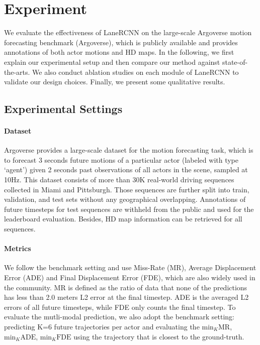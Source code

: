 \section{Experiment}

We evaluate the effectiveness of LaneRCNN on the large-scale Argoverse motion
forecasting benchmark (Argoverse), which is publicly available and provides annotations
of both actor motions and HD maps. In the following, we first
explain our experimental setup and then compare our method against
state-of-the-arts. We also conduct ablation studies on each
module of LaneRCNN to validate our design choices. Finally, we present some
qualitative results.

\subsection{Experimental Settings}
\paragraph{Dataset}
Argoverse provides a large-scale dataset \cite{argoverse} for the
motion forecasting task, which is to
forecast 3 seconds future motions of a particular actor (labeled with type
`agent') given 2 seconds past observations of all
actors in the scene, sampled at 10Hz. 
This dataset consists of more than 30K real-world driving sequences collected in Miami and Pittsburgh.
Those sequences are further split into train, validation, and test sets without
any geographical overlapping. 
Annotations of future timesteps for test sequences are withheld from the public and used for
the leaderboard evaluation. Besides, HD map information can be retrieved for all
sequences. 

\paragraph{Metrics} We follow the benchmark setting and use Miss-Rate (MR), Average
Displacement Error (ADE) and Final Displacement Error (FDE), which are also
widely used in the community. MR is defined as the ratio of data that none of
the predictions has less than 2.0 meters L2 error at the final timestep. ADE is
the averaged L2 errors of all future timesteps, while FDE only
counts the final timestep. To evaluate the mutli-modal prediction, we
also adopt the benchmark setting: predicting K=6 future trajectories
per actor and evaluating the $\text{min}_{K}\text{MR}$, $\text{min}_{K}\text{ADE}$,
$\text{min}_{K}\text{FDE}$ using the trajectory that is closest to the
ground-truth.

